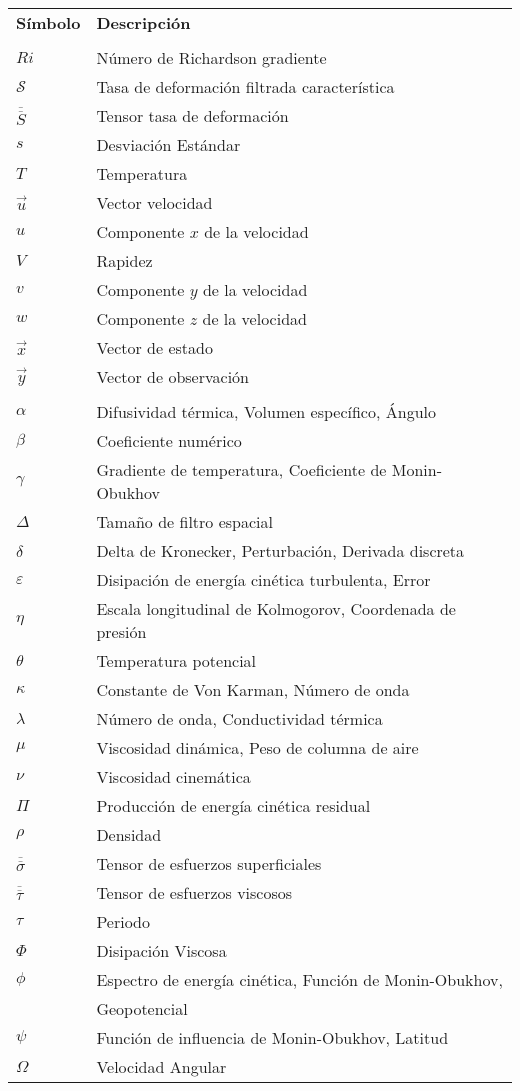 \newpage
\begin{tabular}{ll}
	\textbf{Símbolo} & \textbf{Descripción} \\
	& \\
	$Ri$ & Número de Richardson gradiente  \\
	$\mathcal{S}$ & Tasa de deformación filtrada característica\\
	$\overline{\overline{S}}$ & Tensor tasa de deformación    \\
	$s$ & Desviación Estándar \\
	$T$ &   Temperatura  \\
	$\vec u$ & Vector velocidad     \\
	$u$ & Componente $x$ de la velocidad \\
	$V$ & Rapidez     \\
	$v$ & Componente $y$ de la velocidad  \\
	$w$ & Componente $z$ de la velocidad  \\
	$\vec{x}$ & Vector de estado \\
	$\vec{y}$ & Vector de observación \\
	& \\
	$\alpha$ &  Difusividad térmica, Volumen específico, Ángulo    \\
	$\beta$ & Coeficiente numérico  \\
	$\gamma$ &  Gradiente de temperatura, Coeficiente de Monin-Obukhov  \\
	$\Delta$ & Tamaño de filtro espacial  \\
	$\delta$ & Delta de Kronecker, Perturbación, Derivada discreta     \\
	$\varepsilon$ & Disipación de energía cinética turbulenta, Error \\
	$\eta$ & Escala longitudinal de Kolmogorov, Coordenada de presión \\
	$\theta$ &   Temperatura potencial   \\
	$\kappa$ &   Constante de Von Karman, Número de onda   \\
	$\lambda$ & Número de onda, Conductividad térmica  \\	
	$\mu$ & Viscosidad dinámica, Peso de columna de aire    \\
	$\nu$ & Viscosidad cinemática     \\
	$\Pi$ & Producción de energía cinética residual \\
	$\rho$ & Densidad     \\
	$\overline{\overline{\sigma}}$ & Tensor de esfuerzos superficiales   \\
	$\overline{\overline{\tau}}$ & Tensor de esfuerzos viscosos    \\
	$\tau$ &  Periodo  \\
	$\Phi$ & Disipación Viscosa  \\	
	$\phi$ & Espectro de energía cinética, Función de Monin-Obukhov,\\
	&  Geopotencial     \\
	$\psi$ & Función de influencia de Monin-Obukhov, Latitud    \\
	$\Omega$ & Velocidad Angular \\	
\end{tabular}

